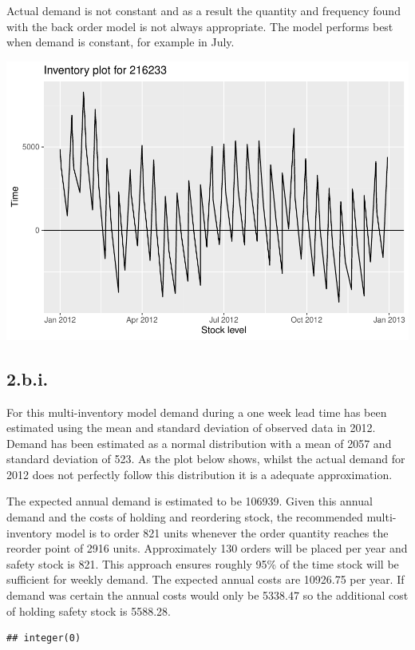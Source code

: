 \documentclass[
  11pt,
]{article}
\begin{document}
Actual demand is not constant and as a result the quantity and frequency
found with the back order model is not always appropriate. The model
performs best when demand is constant, for example in July.

\includegraphics[width=0.75\linewidth]{Assignment-STAT702---final_files/figure-latex/2aiii-1}

\hypertarget{b.i.}{%
\subsection{2.b.i.}\label{b.i.}}

For this multi-inventory model demand during a one week lead time has
been estimated using the mean and standard deviation of observed data in
2012. Demand has been estimated as a normal distribution with a mean of
2057 and standard deviation of 523. As the plot below shows, whilst the
actual demand for 2012 does not perfectly follow this distribution it is
a adequate approximation.

The expected annual demand is estimated to be 106939. Given this annual
demand and the costs of holding and reordering stock, the recommended
multi-inventory model is to order 821 units whenever the order quantity
reaches the reorder point of 2916 units. Approximately 130 orders will
be placed per year and safety stock is 821. This approach ensures
roughly 95\% of the time stock will be sufficient for weekly demand. The
expected annual costs are 10926.75 per year. If demand was certain the
annual costs would only be 5338.47 so the additional cost of holding
safety stock is 5588.28.

\begin{verbatim}
## integer(0)
\end{verbatim}
\end{document}
